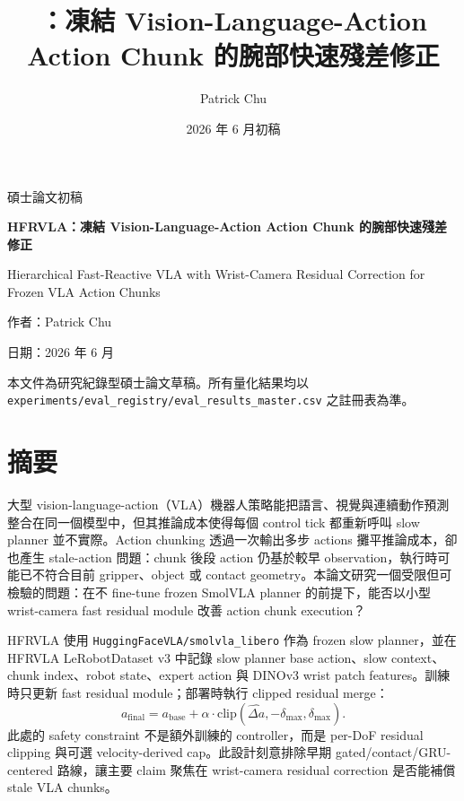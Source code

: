 \documentclass[12pt,a4paper,oneside]{report}
\title{\method{}：凍結 Vision-Language-Action Action Chunk 的腕部快速殘差修正}
\author{Patrick Chu}
\date{2026 年 6 月初稿}
\newcommand{\method}{HFRVLA}
\newcommand{\smolvla}{SmolVLA}
\newcommand{\abase}{a_{\mathrm{base}}}
\newcommand{\afinal}{a_{\mathrm{final}}}
\newcommand{\deltah}{\hat{\Delta a}}
\newcommand{\dmax}{\delta_{\max}}
\newcommand{\clip}{\mathrm{clip}}
\begin{document}
\begin{titlepage}
\centering
{\Large 碩士論文初稿\par}
\vspace{1.2cm}
{\huge \bfseries \method{}：凍結 Vision-Language-Action Action Chunk 的腕部快速殘差修正\par}
\vspace{1.2cm}
{\Large Hierarchical Fast-Reactive VLA with Wrist-Camera Residual Correction for Frozen VLA Action Chunks\par}
\vfill
{\large 作者：Patrick Chu\par}
{\large 日期：2026 年 6 月\par}
\vspace{0.8cm}
{\small 本文件為研究紀錄型碩士論文草稿。所有量化結果均以 \texttt{experiments/eval\_registry/eval\_results\_master.csv} 之註冊表為準。}
\end{titlepage}

\chapter*{摘要}

大型 vision-language-action（VLA）機器人策略能把語言、視覺與連續動作預測整合在同一個模型中，但其推論成本使得每個 control tick 都重新呼叫 slow planner 並不實際。Action chunking 透過一次輸出多步 actions 攤平推論成本，卻也產生 stale-action 問題：chunk 後段 action 仍基於較早 observation，執行時可能已不符合目前 gripper、object 或 contact geometry。本論文研究一個受限但可檢驗的問題：在不 fine-tune frozen \smolvla{} planner 的前提下，能否以小型 wrist-camera fast residual module 改善 action chunk execution？

\method{} 使用 \texttt{HuggingFaceVLA/smolvla\_libero} 作為 frozen slow planner，並在 HFRVLA LeRobotDataset v3 中記錄 slow planner base action、slow context、chunk index、robot state、expert action 與 DINOv3 wrist patch features。訓練時只更新 fast residual module；部署時執行 clipped residual merge：
\begin{equation*}
  \afinal = \abase + \alpha \cdot \clip(\deltah, -\dmax, \dmax).
\end{equation*}
此處的 safety constraint 不是額外訓練的 controller，而是 per-DoF residual clipping 與可選 velocity-derived cap。此設計刻意排除早期 gated/contact/GRU-centered 路線，讓主要 claim 聚焦在 wrist-camera residual correction 是否能補償 stale VLA chunks。
\end{document}
